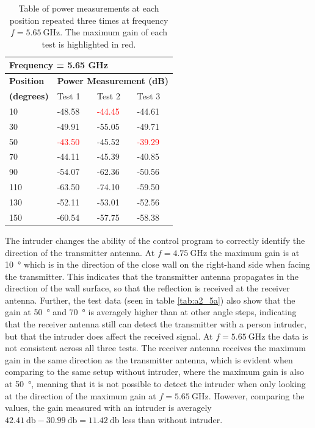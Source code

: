 \begin{table}[H]
    \centering
    \begin{tabular}{l|l|l|l}
        \multicolumn{4}{l}{\textbf{Frequency = 5.65 GHz}}         \\
        \hline
        \textbf{Position} & \multicolumn{3}{l}{\textbf{Power Measurement (dB)}} \\
        \textbf{(degrees)}  & Test 1    & Test 2  & Test 3  \\
        \hline
        \hline
        10      & -48.58    & \textcolor{red}{-44.45}    & -44.61 \\
        30      & -49.91    & -55.05    & -49.71 \\
        50      & \textcolor{red}{-43.50}    & -45.52    & \textcolor{red}{-39.29} \\
        70      & -44.11    & -45.39    & -40.85 \\
        90      & -54.07    & -62.36    & -50.56 \\
        110     & -63.50    & -74.10    & -59.50 \\
        130     & -52.11    & -53.01    & -52.56 \\
        150     & -60.54    & -57.75    & -58.38
        \end{tabular}
    \caption{Table of power measurements at each position repeated three times at frequency $f=\SI{5.65}{\giga\hertz}$. The maximum gain of each test is highlighted in red.}
    \label{tab:a2_5b}
\end{table}

The intruder changes the ability of the control program to correctly identify the direction of the transmitter antenna. At $f=\SI{4.75}{\giga\hertz}$ the maximum gain is at \SI{10}{\degree} which is in the direction of the close wall on the right-hand side when facing the transmitter. This indicates that the transmitter antenna propagates in the direction of the wall surface, so that the reflection is received at the receiver antenna. Further, the test data (seen in table \ref{tab:a2_5a}) also show that the gain at \SI{50}{\degree} and \SI{70}{\degree} is averagely higher than at other angle steps, indicating that the receiver antenna still can detect the transmitter with a person intruder, but that the intruder does affect the received signal. At $f=\SI{5.65}{\giga\hertz}$ the data is not consistent across all three tests. The receiver antenna receives the maximum gain in the same direction as the transmitter antenna, which is evident when comparing to the same setup without intruder, where the maximum gain is also at \SI{50}{\degree}, meaning that it is not possible to detect the intruder when only looking at the direction of the maximum gain at $f=\SI{5.65}{\giga\hertz}$. However, comparing the values, the gain measured with an intruder is averagely $\SI{42.41}{\decibel}-\SI{30.99}{\decibel}=\SI{11.42}{\decibel}$ less than without intruder. 

